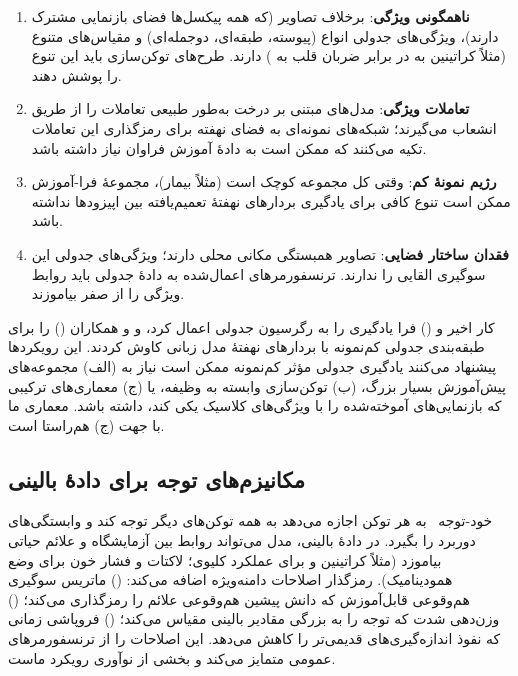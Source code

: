\begin{enumerate}
\item \textbf{ناهمگونی ویژگی}: برخلاف تصاویر (که همه پیکسل‌ها فضای بازنمایی مشترک دارند)، ویژگی‌های جدولی انواع (پیوسته، طبقه‌ای، دوجمله‌ای) و مقیاس‌های متنوع (مثلاً کراتینین به  در برابر ضربان قلب به ) دارند. طرح‌های توکن‌سازی باید این تنوع را پوشش دهند.
\item \textbf{تعاملات ویژگی}: مدل‌های مبتنی بر درخت به‌طور طبیعی تعاملات را از طریق انشعاب می‌گیرند؛ شبکه‌های نمونه‌ای به فضای نهفته برای رمزگذاری این تعاملات تکیه می‌کنند که ممکن است به دادۀ آموزش فراوان نیاز داشته باشد.
\item \textbf{رژیم نمونۀ کم}: وقتی کل مجموعه کوچک است (مثلاً  بیمار)، مجموعۀ فرا-آموزش ممکن است تنوع کافی برای یادگیری بردارهای نهفتۀ تعمیم‌یافته بین اپیزودها نداشته باشد.
\item \textbf{فقدان ساختار فضایی}: تصاویر همبستگی مکانی محلی دارند؛ ویژگی‌های جدولی این سوگیری القایی را ندارند. ترنسفورمرهای اعمال‌شده به دادۀ جدولی باید روابط ویژگی را از صفر بیاموزند.
\end{enumerate}

کار اخیر  و  () فرا یادگیری را به رگرسیون جدولی اعمال کرد، و  و همکاران ()  را برای طبقه‌بندی جدولی کم‌نمونه با بردارهای نهفتۀ مدل زبانی کاوش کردند. این رویکردها پیشنهاد می‌کنند یادگیری جدولی مؤثر کم‌نمونه ممکن است نیاز به (الف) مجموعه‌های پیش‌آموزش بسیار بزرگ، (ب) توکن‌سازی وابسته به وظیفه، یا (ج) معماری‌های ترکیبی که بازنمایی‌های آموخته‌شده را با ویژگی‌های کلاسیک یکی کند، داشته باشد. معماری \texttt{} ما با جهت (ج) هم‌راستا است.

\subsection{مکانیزم‌های توجه برای دادۀ بالینی}

خود-توجه~\cite{vaswani2017attention} به هر توکن اجازه می‌دهد به همه توکن‌های دیگر توجه کند و وابستگی‌های دوربرد را بگیرد. در دادۀ بالینی، مدل می‌تواند روابط بین آزمایشگاه و علائم حیاتی بیاموزد (مثلاً کراتینین و  برای عملکرد کلیوی؛ لاکتات و فشار خون برای وضع همودینامیک). رمزگذار  اصلاحات دامنه‌ویژه اضافه می‌کند: () ماتریس سوگیری هم‌وقوعی قابل‌آموزش که دانش پیشین هم‌وقوعی علائم را رمزگذاری می‌کند؛ () وزن‌دهی شدت که توجه را به بزرگی مقادیر بالینی مقیاس می‌کند؛ () فروپاشی زمانی که نفوذ اندازه‌گیری‌های قدیمی‌تر را کاهش می‌دهد. این اصلاحات  را از ترنسفورمرهای عمومی متمایز می‌کند و بخشی از نوآوری رویکرد ماست.

